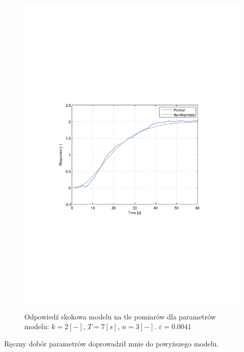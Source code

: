 \documentclass[12pt]{article}
\begin{document}
\begin{figure}[!htb]
	\begin{center}
		\includegraphics[width=14cm,trim=3cm 9cm 3cm 9cm,clip]
		{../res/img/k3_2_7_3.pdf}
	\end{center}
	\caption{Odpowiedź skokowa modelu na tle pomiarów dla parametrów modelu:
	$k=2[-]$, $T=7[s]$, $n=3[-]$. $\varepsilon=0.0041$}
\end{figure}

Ręczny dobór parametrów doprowadził mnie do powyższego modelu.

\newpage 
\end{document}

